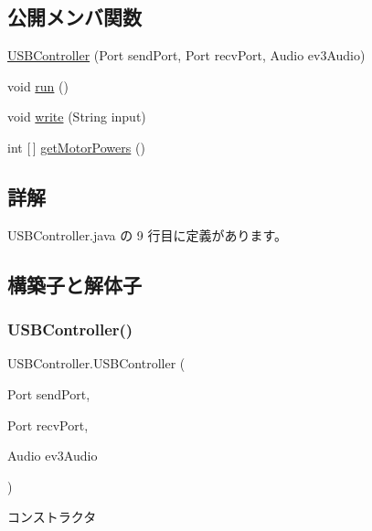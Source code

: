 \subsection*{公開メンバ関数}
\begin{DoxyCompactItemize}
\item 
\mbox{\hyperlink{class_u_s_b_controller_ae8e0a2a27f93a001f3ebd28c0e115b7a}{U\+S\+B\+Controller}} (Port send\+Port, Port recv\+Port, Audio ev3\+Audio)
\item 
void \mbox{\hyperlink{class_u_s_b_controller_a3764a01faaee1b82985a787c44a4dab1}{run}} ()
\item 
void \mbox{\hyperlink{class_u_s_b_controller_afe8a9c9fdb005132410e327153c984f4}{write}} (String input)
\item 
int \mbox{[}$\,$\mbox{]} \mbox{\hyperlink{class_u_s_b_controller_abd4b47f1e86159dfd7ab01ad28f21b40}{get\+Motor\+Powers}} ()
\end{DoxyCompactItemize}


\subsection{詳解}


 U\+S\+B\+Controller.\+java の 9 行目に定義があります。



\subsection{構築子と解体子}
\mbox{\label{class_u_s_b_controller_ae8e0a2a27f93a001f3ebd28c0e115b7a}} 
\subsubsection{\texorpdfstring{USBController()}{USBController()}}
{\footnotesize\ttfamily U\+S\+B\+Controller.\+U\+S\+B\+Controller (\begin{DoxyParamCaption}\item[{Port}]{send\+Port,  }\item[{Port}]{recv\+Port,  }\item[{Audio}]{ev3\+Audio }\end{DoxyParamCaption})\hspace{0.3cm}{\ttfamily [inline]}}

コンストラクタ 

